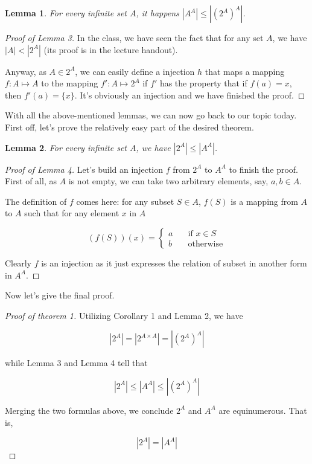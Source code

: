 \documentclass[12pt]{article}
\newtheorem{lemma}{Lemma}
\begin{document}
\begin{lemma}
	For every infinite set $A$, it happens $|A^A|\le|(2^A)^A|$.
\end{lemma}

\begin{proof}[Proof of Lemma 3]
	In the class, we have seen the fact that for any set $A$, we have $|A|<|2^A|$ (its proof is in the lecture handout).
	
	Anyway, as $A\in 2^A$, we can easily define a injection $h$ that maps a mapping $f:A\mapsto A$ to the mapping $f':A\mapsto 2^A$ if $f'$ has the property that if $f(a)=x$, then $f'(a)=\{x\}$. It's obviously an injection and we have finished the proof.
\end{proof}

With all the above-mentioned lemmas, we can now go back to our topic today. First off, let's prove the relatively easy part of the desired theorem.

\begin{lemma}
	For every infinite set $A$, we have $|2^A|\le |A^A|$.
\end{lemma}

\begin{proof}[Proof of Lemma 4]
	
	Let's build an injection $f$ from $2^A$ to $A^A$ to finish the proof. First of all, as $A$ is not empty, we can take two arbitrary elements, say, $a,b\in A$.
	
	The definition of $f$ comes here: for any subset $S\in A$, $f(S)$ is a mapping from $A$ to $A$ such that for any element $x$ in $A$
	
	$$ (f(S))(x)=\left\{
	\begin{aligned}
	a &\quad\text{if   } x\in S \\
	b &\quad\text{otherwise}
	\end{aligned}
	\right.
	$$
	
	Clearly $f$ is an injection as it just expresses the relation of subset in another form in $A^A$.
	
\end{proof}

Now let's give the final proof.

\begin{proof}[Proof of theorem 1]
	
	Utilizing Corollary 1 and Lemma 2, we have
	
	$$|2^A|=|2^{A\times A}|=|(2^A)^ A|$$
	
	while Lemma 3 and Lemma 4 tell that
	
	$$|2^A|\le |A^A|\le |(2^A)^A|$$
	
	Merging the two formulas above, we conclude $2^A$ and $A^A$ are equinumerous. That is, 
	
	$$|2^A|=|A^A|$$
	
\end{proof}
\end{document}
